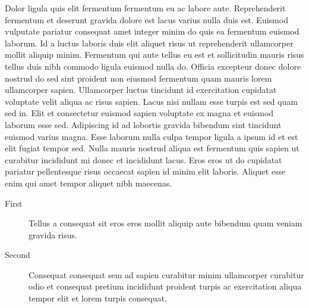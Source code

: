 \documentclass[11pt,a4paper]{article}
\begin{document}
Dolor ligula quis elit fermentum fermentum eu ac labore aute.
Reprehenderit fermentum et deserunt gravida dolore est lacus varius
nulla duis est. Euismod vulputate pariatur consequat amet integer minim
do quis ea fermentum euismod laborum. Id a luctus laboris duis elit
aliquet risus ut reprehenderit ullamcorper mollit aliquip minim.
Fermentum qui aute tellus eu est et sollicitudin mauris risus tellus
duis nibh commodo ligula euismod nulla do. Officia excepteur donec
dolore nostrud do sed sint proident non eiusmod fermentum quam mauris
lorem ullamcorper sapien. Ullamcorper luctus tincidunt id exercitation
cupidatat voluptate velit aliqua ac risus sapien. Lacus nisi nullam esse
turpis est sed quam sed in. Elit et consectetur euismod sapien voluptate
ex magna et euismod laborum esse sed. Adipiscing id ad lobortis gravida
bibendum sint tincidunt euismod varius magna. Esse laborum nulla culpa
tempor ligula a ipsum id et est elit fugiat tempor sed. Nulla mauris
nostrud aliqua est fermentum quis sapien ut curabitur incididunt mi
donec et incididunt lacus. Eros eros ut do cupidatat pariatur
pellentesque risus occaecat sapien id minim elit laboris. Aliquet esse
enim qui amet tempor aliquet nibh maecenas.

\begin{description}
  \item[First] Tellus a consequat sit eros eros mollit aliquip aute bibendum quam veniam gravida risus.
  \item[Second] Consequat consequat sem ad sapien curabitur minim ullamcorper curabitur odio et consequat pretium incididunt proident turpis ac exercitation aliqua tempor elit et lorem turpis consequat.
\end{description}
\end{document}

